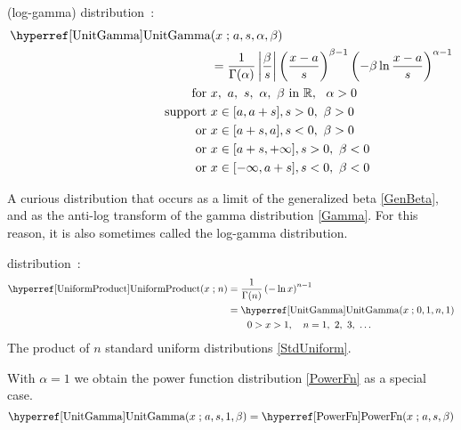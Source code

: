 


\label{sec:UnitGamma}
 (log-gamma) distribution~\cite{Olshen1938,Consul1971,Grassia1977,Gupta2004}:
\begin{align}
\label{UnitGamma}
\opr{UnitGamma}&(x\given a, s,\alpha,\beta) \\ \notag &= \frac{1}{\Gamma(\alpha)} \left|\frac{\beta}{ s}\right|
\left(\frac{x-a}{s}\right)^{\beta-1} \left(-\beta \ln   \frac{x-a}{s} \right)^{\alpha-1}  \checked
\notag
\\ \text{for }& x,\ a,\ s,\ \alpha,\ \beta \text{ in } \mathbb{R},\ \ \alpha >0
\notag
 \\ \text{ support } & x \in [a,a+s], s>0,\ \beta>0 \notag \\ \text{ or } &  x\in[a+s,a], s<0,\ \beta>0 
 \notag 
 \\  \notag  \text{ or } &  x\in[a+s,+\infty], s>0,\ \beta<0 
 \\  \notag  \text{ or } &  x\in[-\infty,a+s], s<0,\ \beta<0 
\end{align}

A curious distribution that occurs as a limit of the generalized beta \eqref{GenBeta}, and as the anti-log transform of the gamma distribution \eqref{Gamma}. For this reason, it is also sometimes called the log-gamma distribution.





 distribution~\cite{Springer1979a}:
\begin{align}
\label{UniformProduct}
\opr{UniformProduct}(x\given n) &=  \frac{1}{\Gamma(n)} \left( -\ln x \right)^{n-1} 	\checked
 \\ \notag & = \opr{UnitGamma}(x\given 0, 1,n,1)							\checked
 \\ \notag & \qquad 0>x>1, \quad n = 1,\ 2,\ 3,\ \ldots							\checked
\end{align}
The product of $n$ standard uniform distributions \eqref{StdUniform}.



With  $\alpha=1$ we obtain the power function distribution \eqref{PowerFn} as a special case.
\[
\opr{UnitGamma}(x\given a, s,1,\beta) = \opr{PowerFn}(x\given a,s,\beta) \checked \notag
\]

